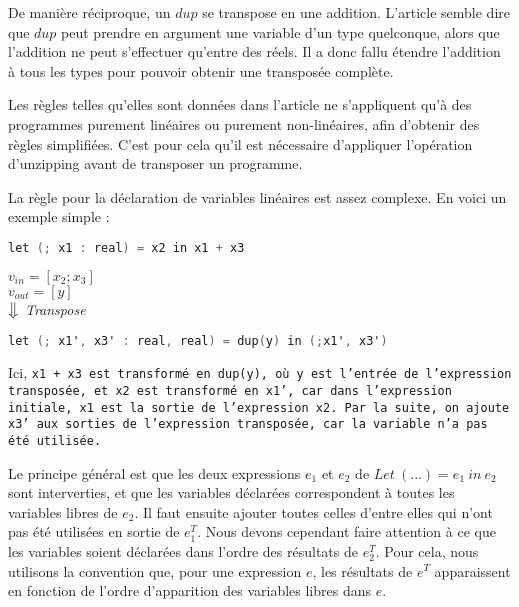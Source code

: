 \documentclass[a4paper, french, 11pt]{article}
\begin{document}
De manière réciproque, un $dup$ se transpose en une addition. L'article semble dire que $dup$ peut prendre en argument une variable d'un type quelconque, alors que l'addition ne peut s'effectuer qu'entre des réels. Il a donc fallu étendre l'addition à tous les types pour pouvoir obtenir une transposée complète.

Les règles telles qu'elles sont données dans l'article ne s'appliquent qu'à des programmes purement linéaires ou purement non-linéaires, afin d'obtenir des règles simplifiées. C'est pour cela qu'il est nécessaire d'appliquer l'opération d'unzipping avant de transposer un programme.

La règle pour la déclaration de variables linéaires est assez complexe. En voici un exemple simple :

\begin{lstlisting}[style=myStyle, language=C]
let (; x1 : real) = x2 in x1 + x3
\end{lstlisting}  

\begin{center}
  $v_{in} = [x_2; x_3]$\\
  $v_{out} = [y]$\\
  $\big\Downarrow$ \textit{Transpose}
\end{center}

\begin{lstlisting}[style=myStyle, language=C]
let (; x1', x3' : real, real) = dup(y) in (;x1', x3')
\end{lstlisting}

Ici, \tt x1 + x3 \rm est transformé en \tt dup(y)\rm, où \tt y \rm est l'entrée de l'expression transposée, et \tt x2 \rm est transformé en \tt x1'\rm, car dans l'expression initiale, \tt x1 \rm est la sortie de l'expression \tt x2\rm. Par la suite, on ajoute \tt x3' \rm aux sorties de l'expression transposée, car la variable n'a pas été utilisée.

Le principe général est que les deux expressions $e_1$ et $e_2$ de $Let ~(...) = e_1 ~in ~e_2$ sont interverties, et que les variables déclarées correspondent à toutes les variables libres de $e_2$. Il faut ensuite ajouter toutes celles d'entre elles qui n'ont pas été utilisées en sortie de $e_1^T$. Nous devons cependant faire attention à ce que les variables soient déclarées dans l'ordre des résultats de $e_2^T$. Pour cela, nous utilisons la convention que, pour une expression $e$, les résultats de $e^T$ apparaissent en fonction de l'ordre d'apparition des variables libres dans $e$.
\end{document}
